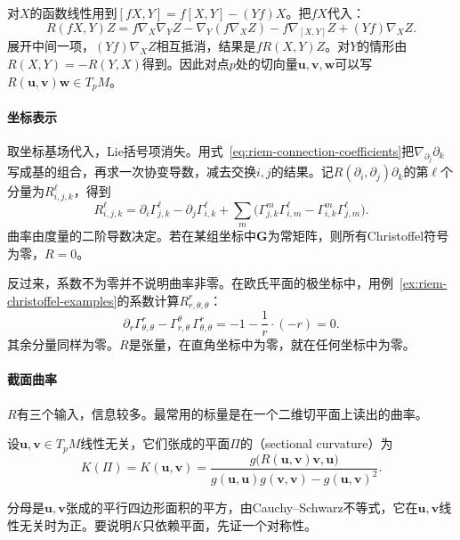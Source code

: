 对$X$的函数线性用到$[fX,Y]=f[X,Y]-(Yf)X$。把$fX$代入：
\[
R(fX,Y)Z=f\nabla_X\nabla_YZ-\nabla_Y(f\nabla_XZ)-f\nabla_{[X,Y]}Z+(Yf)\nabla_XZ .
\]
展开中间一项，$(Yf)\nabla_XZ$相互抵消，结果是$fR(X,Y)Z$。对$Y$的情形由$R(X,Y)=-R(Y,X)$得到。因此对点$p$处的切向量$\bm u,\bm v,\bm w$可以写$R(\bm u,\bm v)\bm w\in T_pM$。

\paragraph{坐标表示}
取坐标基场代入，Lie括号项消失。用式~\eqref{eq:riem-connection-coefficients}把$\nabla_{\partial_j}\partial_k$写成基的组合，再求一次协变导数，减去交换$i,j$的结果。记$R(\partial_i,\partial_j)\partial_k$的第$\ell$个分量为$R^\ell_{i,j,k}$，得到
\begin{equation}
R^\ell_{i,j,k}=\partial_i\Gamma^\ell_{j,k}-\partial_j\Gamma^\ell_{i,k}+\sum_m\bigl(\Gamma^m_{j,k}\Gamma^\ell_{i,m}-\Gamma^m_{i,k}\Gamma^\ell_{j,m}\bigr).
\label{eq:riem-curvature-coordinates}
\end{equation}
曲率由度量的二阶导数决定。若在某组坐标中$\bm G$为常矩阵，则所有Christoffel符号为零，$R=0$。

反过来，系数不为零并不说明曲率非零。在欧氏平面的极坐标中，用例~\ref{ex:riem-christoffel-examples}的系数计算$R^r_{r,\theta,\theta}$：
\[
\partial_r\Gamma^r_{\theta,\theta}-\Gamma^\theta_{r,\theta}\,\Gamma^r_{\theta,\theta}
=-1-\frac1r\cdot(-r)=0 .
\]
其余分量同样为零。$R$是张量，在直角坐标中为零，就在任何坐标中为零。

\paragraph{截面曲率}
$R$有三个输入，信息较多。最常用的标量是在一个二维切平面上读出的曲率。

\begin{definition}[截面曲率]
\label{def:riem-sectional-curvature}
设$\bm u,\bm v\in T_pM$线性无关，它们张成的平面$\Pi$的（sectional curvature）为
\begin{equation}
K(\Pi)=K(\bm u,\bm v)=\frac{g\bigl(R(\bm u,\bm v)\bm v,\bm u\bigr)}{g(\bm u,\bm u)g(\bm v,\bm v)-g(\bm u,\bm v)^2}.
\label{eq:riem-sectional-curvature}
\end{equation}
\end{definition}

分母是$\bm u,\bm v$张成的平行四边形面积的平方，由Cauchy--Schwarz不等式，它在$\bm u,\bm v$线性无关时为正。要说明$K$只依赖平面，先证一个对称性。

